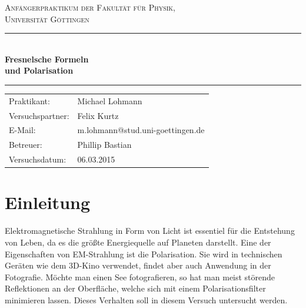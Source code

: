 \documentclass[12pt,a4paper,titlepage,headinclude,bibtotoc]{scrartcl}
\begin{document}
\begin{titlepage}
\centering
\textsc{\Large Anfängerpraktikum der Fakultät für
  Physik,\\[1.5ex] Universität Göttingen}

\vspace*{3cm}

\rule{\textwidth}{1pt}\\[0.5cm]
{\huge \bfseries
  Fresnelsche Formeln\\[1.5ex]
  und Polarisation}\\[0.5cm]
\rule{\textwidth}{1pt}

\vspace*{3cm}

\begin{Large}
\begin{tabular}{ll}
Praktikant: &  Michael Lohmann\\
Versuchspartner: &  Felix Kurtz\\
 E-Mail: & m.lohmann@stud.uni-goettingen.de\\
 Betreuer: & Phillip Bastian\\
 Versuchsdatum: & 06.03.2015\\
\end{tabular}
\end{Large}

\vspace*{0.8cm}

\begin{Large}
\end{Large}

\end{titlepage}

\tableofcontents

\newpage

\section{Einleitung}
\label{sec:einleitung}
Elektromagnetische Strahlung in Form von Licht ist essentiel für die Entstehung von Leben, da es die größte Energiequelle auf Planeten darstellt.
Eine der Eigenschaften von EM-Strahlung ist die Polarisation.
Sie wird in technischen Geräten wie dem 3D-Kino verwendet, findet aber auch Anwendung in der Fotografie.
Möchte man einen See fotografieren, so hat man meist störende Reflektionen an der Oberfläche, welche sich mit einem Polarisationsfilter minimieren lassen.
Dieses Verhalten soll in diesem Versuch untersucht werden.
\end{document}
